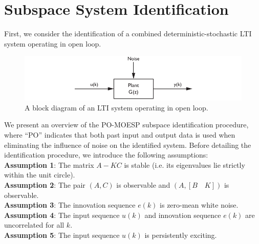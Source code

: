 \section{Subspace System Identification}
First, we consider the identification of a combined deterministic-stochastic LTI system operating in open loop.
\begin{figure}[htb!]
	\centering
	\includegraphics{../fig/open_loop_block_diagram.pdf}
	\caption{A block diagram of an LTI system operating in open loop.}
\end{figure}
We present an overview of the PO-MOESP subspace identification procedure, where ``PO'' indicates that both past input and output data is used when eliminating the influence of noise on the identified system. Before detailing the identification procedure, we introduce the following assumptions:\\
\textbf{Assumption 1}: The matrix $A - KC$ is stable (i.e. its eigenvalues lie strictly within the unit circle).\\
\textbf{Assumption 2}: The pair $(A,C)$ is observable and $(A, [B \quad K])$ is observable.\\
\textbf{Assumption 3}: The innovation sequence $e(k)$ is zero-mean white noise.\\
\textbf{Assumption 4}: The input sequence $u(k)$ and innovation sequence $e(k)$ are uncorrelated for all $k$.\\
\textbf{Assumption 5}: The input sequence $u(k)$ is persistently exciting.

